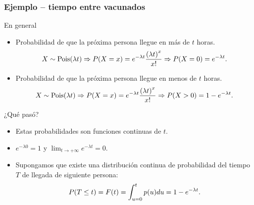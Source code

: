 \documentclass[table]{beamer}
\begin{document}
\begin{frame}
    \frametitle{Ejemplo -- tiempo entre vacunados}
    \begin{block}{En general}
        \begin{itemize}
            \item Probabilidad de que la próxima persona llegue en más de $t$ horas.
                \begin{equation*}
                    X \sim \poisson{\lambda t} \Rightarrow \prob{X = x} = e^{- \lambda t} \frac{\parens{\lambda t}^{x}}{x!}
                    \Rightarrow \prob{X = 0} = e^{- \lambda t} .
                \end{equation*}
            \item Probabilidad de que la próxima persona llegue en menos de $t$ horas.
                \begin{equation*}
                    X \sim \poisson{\lambda t} \Rightarrow \prob{X = x} = e^{- \lambda t} \frac{\parens{\lambda t}^{x}}{x!}
                    \Rightarrow \prob{X > 0} = 1 - e^{- \lambda t} .
                \end{equation*}
        \end{itemize}
    \end{block}
\end{frame}

\begin{frame}

    \begin{block}{¿Qué pasó?}
        \begin{itemize}
            \item Estas probabilidades son funciones continuas de $t$.
            \item $e^{- \lambda 0} = 1$ y $\lim_{t \rightarrow + \infty} e^{- \lambda t} = 0$.
            \item Supongamos que existe una distribución continua de probabilidad del tiempo $T$ de llegada de siguiente persona:
                \begin{equation*}
                    \prob{T \leq t} = \FF{t} = \int_{u = 0}^{t} \pdf{u} d u = 1 - e^{- \lambda t} .
                \end{equation*}
        \end{itemize}
    \end{block}
\end{frame}
\end{document}
